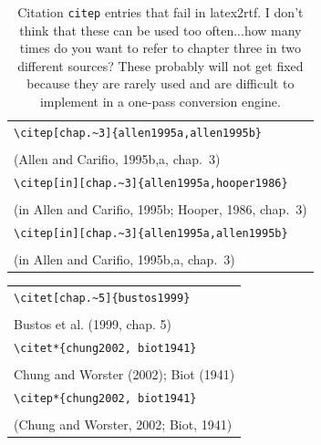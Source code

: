 ﻿\documentclass{article}
\begin{document}
\begin{table}
\begin{center}
\begin{tabular}{l}
    \verb#\citep[chap.~3]{allen1995a,allen1995b}# \\
    \citep[chap.~3]{allen1995a,allen1995b} \\
    (Allen and Carifio, 1995b,a, chap.~3) \\
\hline
    \verb#\citep[in][chap.~3]{allen1995a,hooper1986}# \\
    \citep[in][chap.~3]{allen1995a,hooper1986} \\
    (in Allen and Carifio, 1995b; Hooper, 1986, chap.~3)\\
\hline
    \verb#\citep[in][chap.~3]{allen1995a,allen1995b}# \\
    \citep[in][chap.~3]{allen1995a,allen1995b} \\
    (in Allen and Carifio, 1995b,a, chap.~3)\\
\end{tabular}
\end{center}
\caption{Citation \texttt{citep} entries that fail in latex2rtf.  I don't think
that these can be used too often...how many times do you want to refer to chapter
three in two different sources?  These probably will not get fixed because they
are rarely used and are difficult to implement in a one-pass conversion engine.}
\end{table}

\begin{center}
\begin{tabular}{l}
\verb#\citet[chap.~5]{bustos1999}#\\
\citet[chap.~5]{bustos1999}\\
Bustos et al. (1999, chap. 5)\\
\hline
\verb#\citet*{chung2002, biot1941}#\\
\citet*{chung2002, biot1941}\\
Chung and Worster (2002); Biot (1941)\\
\hline
\verb#\citep*{chung2002, biot1941}#\\
\citep*{chung2002, biot1941}\\
(Chung and Worster, 2002; Biot, 1941)\\
\end{tabular}
\end{center}
\end{document}

